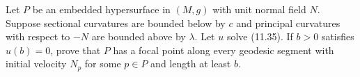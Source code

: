 \begin{exercise}
\label{prob:focal-points-hypersurface-ii}

Let $P$ be an embedded hypersurface in $(M,g)$ with unit normal field $N$.
Suppose sectional curvatures are bounded below by $c$ and principal curvatures
with respect to $-N$ are bounded above by $\lambda$.  Let $u$ solve (11.35).
If $b>0$ satisfies $u(b)=0$, prove that $P$ has a focal point along every
geodesic segment with initial velocity $N_p$ for some $p\in P$ and length at
least $b$.
\end{exercise}
